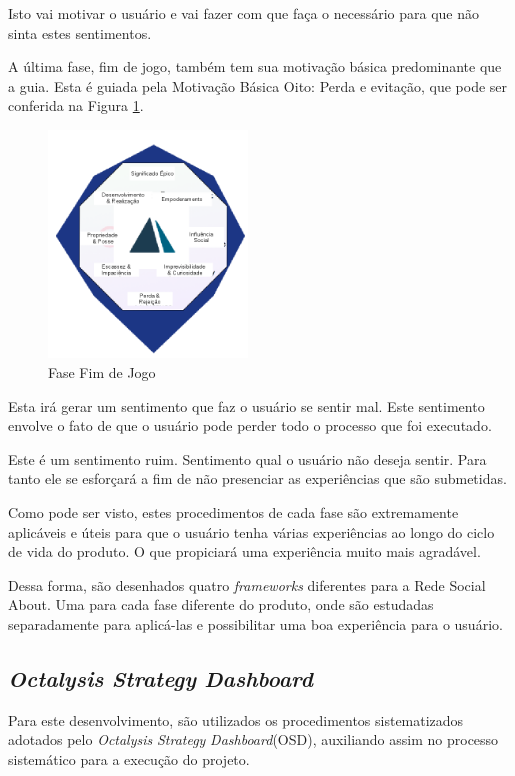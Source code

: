 Isto vai motivar o usuário e vai fazer com que faça o necessário para que não
sinta estes sentimentos.

A última fase, fim de jogo, também tem sua motivação básica predominante que
a guia. Esta é guiada pela Motivação Básica Oito: Perda e evitação, que pode
ser conferida na Figura \ref{fig:fasefimdejogo}.

\begin{figure}[h]
    \centering
    \includegraphics[width=200px, scale=1]{figuras/fasefimdejogo}
    \caption{Fase Fim de Jogo}
    \label{fig:fasefimdejogo}
\end{figure}

Esta irá gerar um sentimento que faz o usuário se sentir mal. Este sentimento
envolve o fato de que o usuário pode perder todo o processo que foi executado.


Este é um sentimento ruim. Sentimento qual o usuário não deseja sentir. Para tanto
ele se esforçará a fim de não presenciar as experiências que são submetidas.

Como pode ser visto, estes procedimentos de cada fase são extremamente aplicáveis
e úteis para que o usuário tenha várias experiências ao longo do ciclo de vida do
produto. O que propiciará uma experiência muito mais agradável.

Dessa forma, são desenhados quatro \textit{frameworks} diferentes para a Rede Social About.
Uma para cada fase diferente do produto, onde são estudadas separadamente para
aplicá-las e possibilitar uma boa experiência para o usuário.

\subsection{\textit{Octalysis} \textit{Strategy} \textit{Dashboard}}
\label{sec:octalysisdashborad}
Para este desenvolvimento, são utilizados os procedimentos sistematizados adotados
pelo \textit{Octalysis} \textit{Strategy} \textit{Dashboard}(OSD), auxiliando assim no processo sistemático para
a execução do projeto. 


